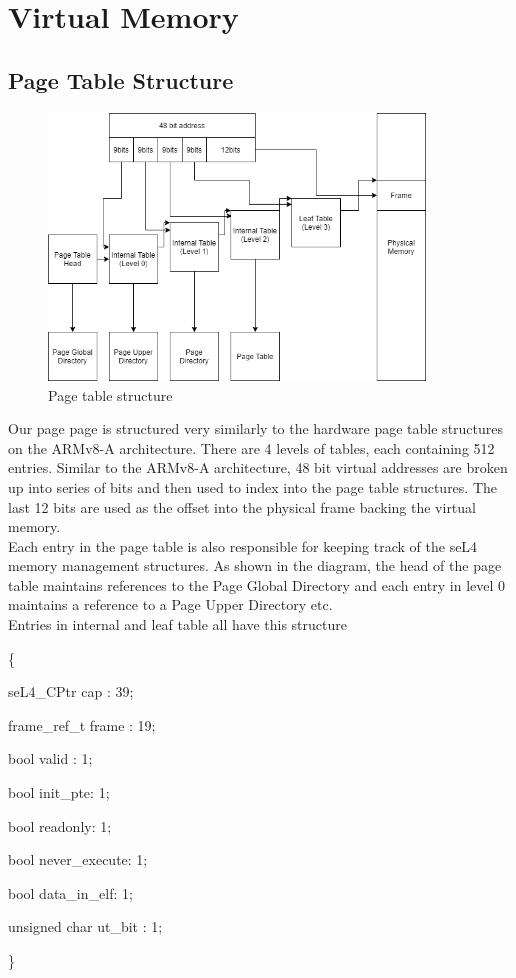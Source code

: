 \section{Virtual Memory}

\subsection{Page Table Structure}

\begin{figure}[h]
    \centering
    \includegraphics[width=100mm]{page_table.png}
    \caption{Page table structure}
    \label{fig:page_table}
\end{figure}

\noindent
Our page page is structured very similarly to the hardware
page table structures on the ARMv8-A architecture.
There are 4 levels of tables, each containing 512 entries.
Similar to the ARMv8-A architecture, 48 bit virtual addresses
are broken up into series of bits and then used to index
into the page table structures. The last 12 bits are used
as the offset into the physical frame backing the virtual memory.
\\

\noindent
Each entry in the page table is also responsible for keeping track
of the seL4 memory management structures.
As shown in the diagram, the head of the page table maintains
references to the Page Global Directory and each entry in level 0
maintains a reference to a Page Upper Directory etc.
\\

\noindent
Entries in internal and leaf table all have this structure

\noindent
\{ \par
    seL4\_CPtr cap : 39; \par
    frame\_ref\_t frame : 19; \par
    bool valid : 1; \par
    bool init\_pte: 1; \par
    bool readonly: 1; \par
    bool never\_execute: 1; \par
    bool data\_in\_elf: 1; \par
    unsigned char ut\_bit : 1; \par
\noindent
\}

